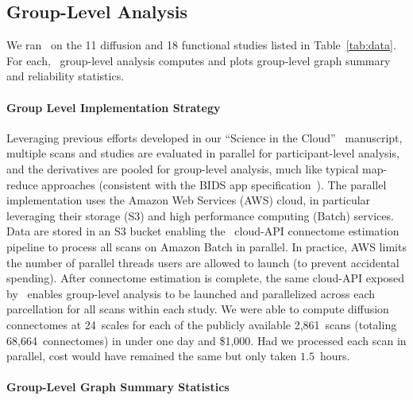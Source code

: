 \documentclass[11pt]{article}
\begin{document}
\begin{multicols}{2}


\subsection{Group-Level Analysis}

We ran \ndmg~on the 11 diffusion and 18 functional studies listed in 
Table~\ref{tab:data}.
For each, \ndmg~group-level analysis computes and plots group-level graph summary and reliability statistics. 



\paragraph{Group Level Implementation Strategy}

Leveraging previous efforts developed in our  ``Science in the Cloud''~\cite{sic} manuscript, multiple scans and studies are evaluated in parallel for participant-level analysis, and the derivatives are pooled for group-level analysis, much like typical map-reduce approaches (consistent with the BIDS app specification~\cite{bidsapps}). The parallel  implementation uses the Amazon Web Services (AWS) cloud, in particular leveraging their storage (S3) and high performance computing (Batch) services. Data are stored in an S3 bucket enabling  the \ndmg~cloud-API connectome estimation pipeline to process all scans on Amazon Batch in parallel. In practice,  AWS limits the number of parallel threads users are allowed to launch (to prevent accidental spending). After connectome estimation is complete, the same cloud-API exposed by \ndmg~enables group-level analysis to be launched and parallelized across each parcellation for all scans within each study.
% 
% 
We were able to compute diffusion connectomes at 24~scales for each of the publicly available 2,861~scans (totaling 68,664~connectomes) in under one day and \$1,000. Had we processed each scan in parallel, cost would have remained the same but only taken $1.5$~hours.

\paragraph{Group-Level Graph Summary Statistics}


\end{multicols}
\end{document}
